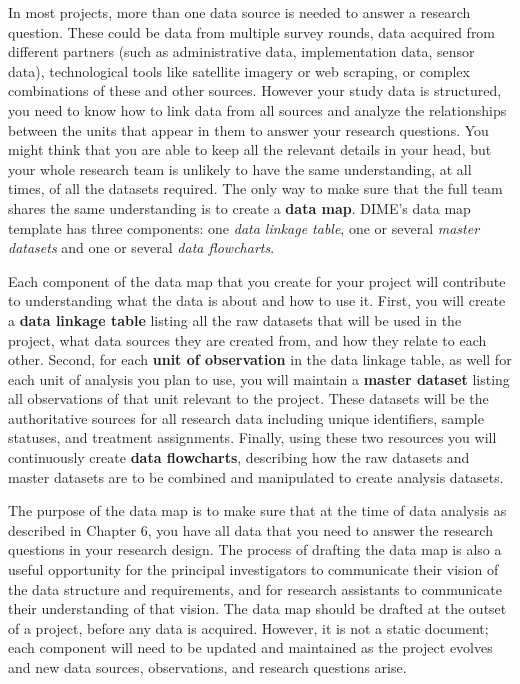 In most projects, more than one data source is needed to answer a research question.
These could be data from multiple survey rounds,
data acquired from different partners
(such as administrative data, implementation data, sensor data),
technological tools like satellite imagery or web scraping,
or complex combinations of these and other sources.
However your study data is structured,
you need to know how to link data from all sources
and analyze the relationships between the units that appear in them
to answer your research questions.
You might think that you are able to keep all the relevant details in your head,
but your whole research team is unlikely to have the same understanding,
at all times, of all the datasets required.
The only way to make sure that the full team shares the same understanding
is to create a \textbf{data map}.
DIME's data map template has three components:
one \textit{data linkage table},
one or several \textit{master datasets}
and one or several \textit{data flowcharts}.

Each component of the data map
that you create for your project
will contribute to understanding
what the data is about and how to use it.
First, you will create a \textbf{data linkage table}
listing all the raw datasets that will be used in the project,
what data sources they are created from,
and how they relate to each other.
Second, for each \textbf{unit of observation}
in the data linkage table,
as well for each unit of analysis you plan to use,
you will maintain a \textbf{master dataset}
listing all observations of that unit relevant to the project.
These datasets will be the authoritative sources for all research data
including unique identifiers, sample statuses, and treatment assignments.
Finally, using these two resources
you will continuously create \textbf{data flowcharts},
describing how the raw datasets and master datasets
are to be combined and manipulated to create analysis datasets.

The purpose of the data map is to make sure that
at the time of data analysis as described in Chapter 6,
you have all data that you need
to answer the research questions in your research design.
The process of drafting the data map is also a useful
opportunity for the principal investigators
to communicate their vision of the data structure and requirements,
and for research assistants to communicate
their understanding of that vision.
The data map should be drafted at the outset of a project,
before any data is acquired.
However, it is not a static document;
each component will need to be updated
and maintained as the project evolves
and new data sources, observations, and research questions arise.

